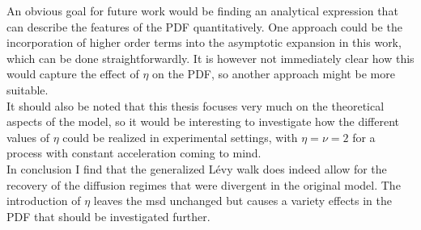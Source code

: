 An obvious goal for future work would be finding an analytical expression that can describe the features of the PDF quantitatively. One approach could be the incorporation of higher order terms into the asymptotic expansion in this work, which can be done straightforwardly. It is however not immediately clear how this would capture the effect of $\eta$ on the \gls{PDF}, so another approach might be more suitable.\\
It should also be noted that this thesis focuses very much on the theoretical aspects of the model, so it would be interesting to investigate how the different values of $\eta$ could be realized in experimental settings, with $\eta=\nu=2$ for a process with constant acceleration coming to mind.\\

In conclusion I find that the generalized L\'evy walk  does indeed allow for the recovery of the diffusion regimes that were divergent in the original model. The introduction of $\eta$ leaves the \gls{msd} unchanged but causes a variety effects in the \gls{PDF} that should be investigated further.


